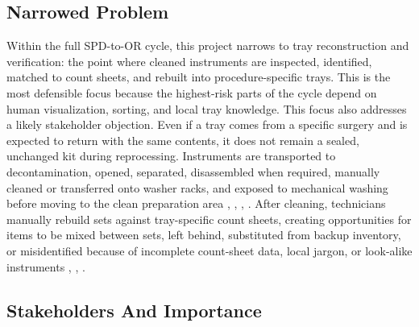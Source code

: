 \documentclass[10pt,a4paper]{article}
\begin{document}
\subsection{Narrowed Problem}
\label{sec:narrowed-problem}

Within the full SPD-to-OR cycle, this project narrows to tray reconstruction
and verification: the point where cleaned instruments are inspected,
identified, matched to count sheets, and rebuilt into procedure-specific trays.
This is the most defensible focus because the highest-risk parts of the cycle
depend on human visualization, sorting, and local tray knowledge.
This focus also addresses a likely stakeholder objection. Even if a tray comes
from a specific surgery and is expected to return with the same contents, it
does not remain a sealed, unchanged kit during reprocessing. Instruments are
transported to decontamination, opened, separated, disassembled when required,
manually cleaned or transferred onto washer racks, and exposed to mechanical
washing before moving to the clean preparation area
\cite{steris-cleaning-instruments-accessed-2026},
\cite{cdc},
\cite{public-health-ontario-2013},
\cite{medline-transport-2026}. After cleaning,
technicians manually rebuild sets against tray-specific count sheets, creating
opportunities for items to be mixed between sets, left behind, substituted from
backup inventory, or misidentified because of incomplete count-sheet data,
local jargon, or look-alike instruments
\cite{purdue-count-sheets-accessed-2026},
\cite{alfred-et-al-2021},
\cite{nadeau-2024}.
\subsection{Stakeholders And Importance}
\label{sec:stakeholders-and-importance}
\end{document}

